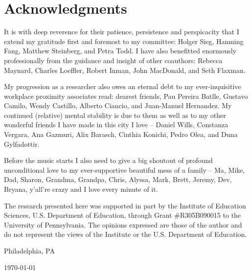\chapter*{Acknowledgments}

It is with deep reverence for their patience, persistence and perspicacity that I extend my gratitude first and foremost to my committee: Holger Sieg, Hanming Fang, Matthew Steinberg, and Petra Todd. I have also benefitted enormously professionally from the guidance and insight of other coauthors: Rebecca Maynard, Charles Loeffler, Robert Inman, John MacDonald, and Seth Flaxman.

My progression as a researcher also owes an eternal debt to my ever-inquisitive workplace proximity associates read: dearest friends, Pau Pereira Batlle, Gustavo Camilo, Wendy Castillo, Alberto Ciancio, and Juan-Manuel Hernandez. My continued (relative) mental stability is due to them as well as to my other wonderful friends I have made in this city I love -- Daniel Wills, Constanza Vergara, Ana Gazmuri, Alix Barasch, Cinthia Konichi, Pedro Olea, and Duna Gylfadottir.

Before the music starts I also need to give a big shoutout of profound unconditional love to my ever-supportive beautiful mess of a family -- Ma, Mike, Dad, Sharon, Grandma, Grandpa, Chris, Alyssa, Mark, Brett, Jeremy, Dev, Bryana, y'all're crazy and I love every minute of it.

The research presented here was supported in part by the Institute of Education Sciences, U.S. Department of Education, through Grant #R305B090015 to the University of Pennsylvania. The opinions expressed are those of the author and do not represent the views of the Institute or the U.S. Department of Education.

\hfill \theauthor

\hfill Philadelphia, PA

\hfill \today
